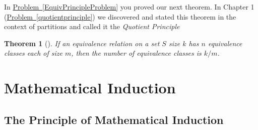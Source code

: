 \documentclass[10pt,]{book}
\theoremstyle{plain}
\newtheorem{theorem}{Theorem}[section]
\theoremstyle{definition}
\theoremstyle{definition}
\numberwithin{equation}{chapter}
\begin{document}
In \hyperref[EquivPrincipleProblem]{Problem~\ref{EquivPrincipleProblem}} you proved our next theorem. In Chapter 1 (\hyperref[quotientprinciple]{Problem~\ref{quotientprinciple}}) we discovered and stated this theorem in the context of partitions and called it the \emph{Quotient Principle}%
\begin{theorem}[{}]\label{theorem-12}
If an equivalence relation on a set \(S\) size \(k\) has \(n\) equivalence classes each of size \(m\), then the number of equivalence classes is \(k/m\).%
\end{theorem}
\typeout{************************************************}
\typeout{************************************************}
\chapter[{Mathematical Induction}]{Mathematical Induction}\label{Induction}
\typeout{************************************************}
\typeout{************************************************}
\section[{The Principle of Mathematical Induction}]{The Principle of Mathematical Induction}\label{app2-1-induction}
\typeout{************************************************}
\typeout{************************************************}
\end{document}
